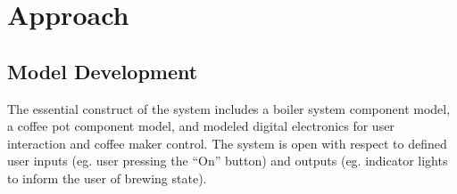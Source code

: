 \documentclass[10pt]{article}
\begin{document}
\section{Approach}
\subsection{Model Development}
The essential construct of the system includes a boiler system component model, a coffee pot component model, and modeled digital electronics for user interaction and coffee maker control.  The system is open with respect to defined user inputs (eg. user pressing the ``On'' button) and outputs (eg. indicator lights to inform the user of brewing state).



\end{document}
